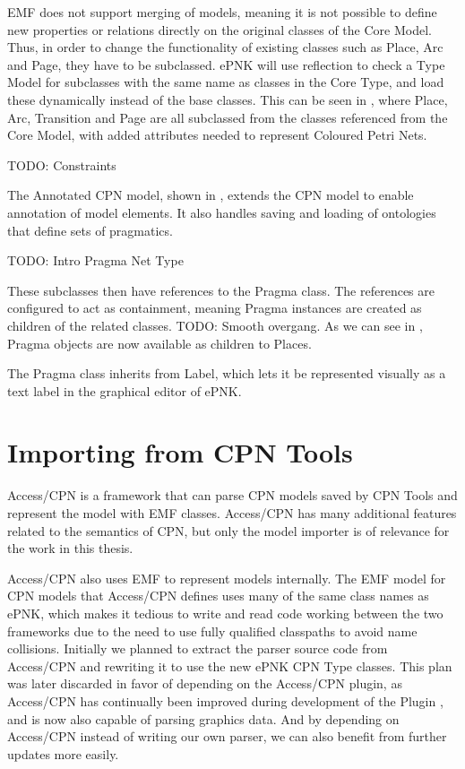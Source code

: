 EMF does not support merging of models, meaning it is not possible to define new
properties or relations directly on the original classes of the Core Model.
Thus, in order to change the functionality of existing classes such as Place,
Arc and Page, they have to be subclassed. ePNK will use reflection to check a
Type Model for subclasses with the same name as classes in the Core Type, and
load these dynamically instead of the base classes.
This can be seen in , where Place, Arc, Transition and Page are all
subclassed from the classes referenced from the Core Model, with added
attributes needed to represent Coloured Petri Nets.

TODO: Constraints

The Annotated CPN model, shown in , extends the CPN
model to enable annotation of model elements. It also handles saving and loading
of ontologies that define sets of pragmatics.

TODO: Intro Pragma Net Type

These subclasses then have references to the Pragma class. The references are
configured to act as containment, meaning Pragma instances are created as
children of the related classes. TODO: Smooth overgang. As we can see in
, Pragma objects are now available as children to Places.


The Pragma class inherits from Label, which lets it be represented visually as a
text label in the graphical editor of ePNK.

\section{Importing from CPN Tools}
Access/CPN is a framework that can parse CPN models saved by CPN Tools and
represent the model with EMF classes. Access/CPN has many additional features
related to the semantics of CPN, but only the model importer is of relevance for
the work in this thesis.

Access/CPN also uses EMF to represent models internally. The EMF model for CPN
models that Access/CPN defines uses many of the same class names as ePNK, which
makes it tedious to write and read code working between the two frameworks due
to the need to use fully qualified classpaths to avoid name collisions.
Initially we planned to extract the parser source code from Access/CPN and
rewriting it to use the new ePNK CPN Type classes. This plan was later discarded in
favor of depending on the Access/CPN plugin, as Access/CPN has continually been
improved during development of the Plugin , and is now also
capable of parsing graphics data. And by depending on Access/CPN instead of writing
our own parser, we can also benefit from further updates more easily.

